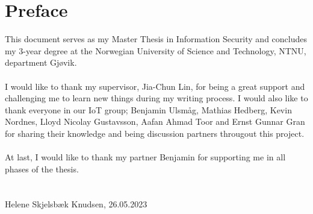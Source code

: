 \chapter*{Preface}

This document serves as my Master Thesis in Information Security and concludes my 3-year degree at the Norwegian University of Science and Technology, NTNU, department Gjøvik.
\\\\
I would like to thank my supervisor, Jia-Chun Lin, for being a great support and challenging me to learn new things during my writing process. I would also like to thank everyone in our IoT group; Benjamin Ulsmåg, Mathias Hedberg, Kevin Nordnes, Lloyd Nicolay Gustavsson, Aafan Ahmad Toor and Ernst Gunnar Gran for sharing their knowledge and being discussion partners througout this project. 
\\\\
At last, I would like to thank my partner Benjamin for supporting me in all phases of the thesis. 
\\\\\\
Helene Skjelsbæk Knudsen, 26.05.2023